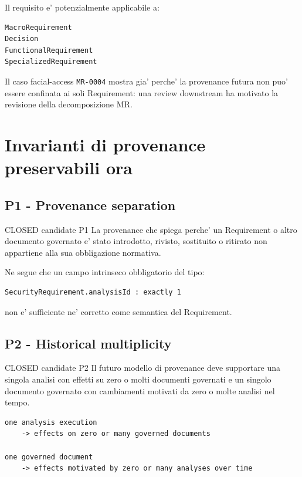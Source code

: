 \documentclass[11pt,a4paper]{article}
\begin{document}
Il requisito e' potenzialmente applicabile a:

\begin{lstlisting}
MacroRequirement
Decision
FunctionalRequirement
SpecializedRequirement
\end{lstlisting}

Il caso facial-access \texttt{MR-0004} mostra gia' perche' la provenance futura non puo' essere confinata ai soli Requirement: una review downstream ha motivato la revisione della decomposizione MR.

\section{Invarianti di provenance preservabili ora}

\subsection{P1 - Provenance separation}

\begin{resultbox}{CLOSED candidate P1}
La provenance che spiega perche' un Requirement o altro documento governato e' stato introdotto, rivisto, sostituito o ritirato non appartiene alla sua obbligazione normativa.
\end{resultbox}

Ne segue che un campo intrinseco obbligatorio del tipo:

\begin{lstlisting}
SecurityRequirement.analysisId : exactly 1
\end{lstlisting}

non e' sufficiente ne' corretto come semantica del Requirement.

\subsection{P2 - Historical multiplicity}

\begin{resultbox}{CLOSED candidate P2}
Il futuro modello di provenance deve supportare una singola analisi con effetti su zero o molti documenti governati e un singolo documento governato con cambiamenti motivati da zero o molte analisi nel tempo.
\end{resultbox}

\begin{lstlisting}
one analysis execution
    -> effects on zero or many governed documents

one governed document
    -> effects motivated by zero or many analyses over time
\end{lstlisting}
\end{document}
